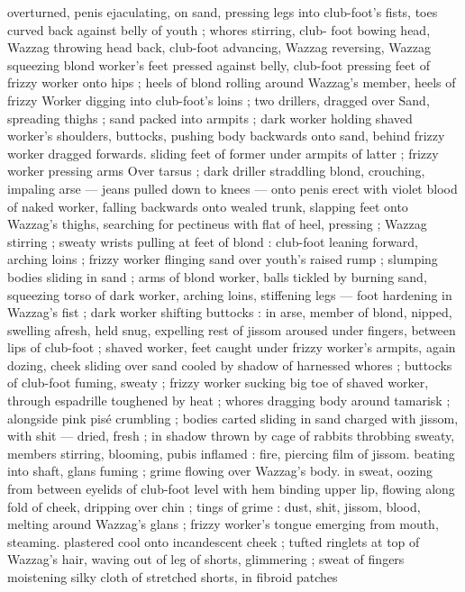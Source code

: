 overturned, penis ejaculating, on sand, pressing legs into club-foot's 
fists, toes curved back against belly of youth ; whores stirring, club- 
foot bowing head, Wazzag throwing head back, club-foot advancing, 
Wazzag reversing, Wazzag squeezing blond worker's feet pressed 
against belly, club-foot pressing feet of frizzy worker onto hips ; 
heels of blond rolling around Wazzag's member, heels of frizzy 
Worker digging into club-foot's loins ; two drillers, dragged over 
Sand, spreading thighs ; sand packed into armpits ; dark worker 
holding shaved worker's shoulders, buttocks, pushing body 
backwards onto sand, behind frizzy worker dragged forwards. sliding 
feet of former under armpits of latter ; frizzy worker pressing arms 
Over tarsus ; dark driller straddling blond, crouching, impaling arse 
--- jeans pulled down to knees --- onto penis erect with violet blood 
of naked worker, falling backwards onto wealed trunk, slapping feet 
onto Wazzag's thighs, searching for pectineus with flat of heel, 
pressing ; Wazzag stirring ; sweaty wrists pulling at feet of blond : 
club-foot leaning forward, arching loins ; frizzy worker flinging sand 
over youth's raised rump ; slumping bodies sliding in sand ; arms of 
blond worker, balls tickled by burning sand, squeezing torso of dark 
worker, arching loins, stiffening legs --- foot hardening in Wazzag's 
fist ; dark worker shifting buttocks : in arse, member of blond, 
nipped, swelling afresh, held snug, expelling rest of jissom aroused 
under fingers, between lips of club-foot ; shaved worker, feet caught 
under frizzy worker's armpits, again dozing, cheek sliding over sand 
cooled by shadow of harnessed whores ; buttocks of club-foot 
fuming, sweaty ; frizzy worker sucking big toe of shaved worker, 
through espadrille toughened by heat ; whores dragging body 
around tamarisk ; alongside pink pisé crumbling ; bodies carted 
sliding in sand charged with jissom, with shit --- dried, fresh ; in 
shadow thrown by cage of rabbits throbbing sweaty, members 
stirring, blooming, pubis inflamed : fire, piercing film of jissom. 
beating into shaft, glans fuming ; grime flowing over Wazzag's body. 
in sweat, oozing from between eyelids of club-foot level with hem 
binding upper lip, flowing along fold of cheek, dripping over chin ; 
tings of grime : dust, shit, jissom, blood, melting around Wazzag's 
glans ; frizzy worker's tongue emerging from mouth, steaming. 
plastered cool onto incandescent cheek ; tufted ringlets at top of 
Wazzag's hair, waving out of leg of shorts, glimmering ; sweat of 
fingers moistening silky cloth of stretched shorts, in fibroid patches 
